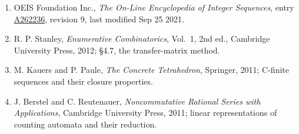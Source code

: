 \documentclass[11pt]{article}
\theoremstyle{definition}
\begin{document}
\begin{enumerate}

\item OEIS Foundation Inc., \emph{The On-Line Encyclopedia of Integer Sequences}, entry \href{https://oeis.org/A262236}{A262236}, revision 9, last modified Sep 25 2021.

\item R. P. Stanley, \emph{Enumerative Combinatorics}, Vol.~1, 2nd ed., Cambridge University Press, 2012; \S4.7, the transfer-matrix method.

\item M. Kauers and P. Paule, \emph{The Concrete Tetrahedron}, Springer, 2011; C-finite sequences and their closure properties.

\item J. Berstel and C. Reutenauer, \emph{Noncommutative Rational Series with Applications}, Cambridge University Press, 2011; linear representations of counting automata and their reduction.

\end{enumerate}
\end{document}
